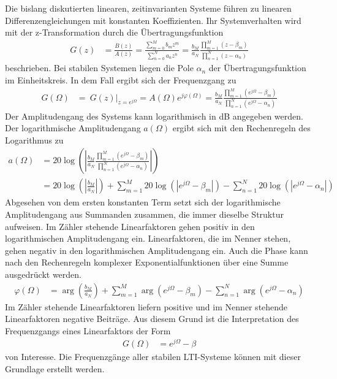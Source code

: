 Die bislang diskutierten linearen, zeitinvarianten Systeme führen zu linearen Differenzengleichungen mit konstanten Koeffizienten. Ihr Systemverhalten wird mit der z-Transformation durch die Übertragungsfunktion
\begin{align}
G(z) &= \frac{B(z)}{A(z)} = \frac{\sum\limits_{m = 0}^{M}{b_{m}  z^{m}}}{\sum\limits_{n = 0}^{N}{a_{n}  z^{n}}} = \frac{b_{M}}{a_{N}}  \frac{\prod\limits_{m = 1}^{M}\left( z - \beta_{m} \right)}{\prod\limits_{n = 1}^{N}\left( z - \alpha_{n} \right)} \label{eq:8.41}
\end{align}
beschrieben. Bei stabilen Systemen liegen die Pole \(α_{n}\) der Übertragungsfunktion im Einheitskreis. In dem Fall ergibt sich der Frequenzgang zu
\begin{align}
G(\Omega) &= \left. \ G(z) \right|_{z = e^{j  \Omega}} = A(\Omega)  e^{j  \varphi(\Omega)} = \frac{b_{M}}{a_{N}}  \frac{\prod\limits_{m = 1}^{M}\left( e^{j  \Omega} - \beta_{m} \right)}{\prod\limits_{n = 1}^{N}\left( e^{j  \Omega} - \alpha_{n} \right)} \label{eq:8.42}
\end{align}
Der Amplitudengang des Systems kann logarithmisch in dB angegeben werden. Der logarithmische Amplitudengang \(a(Ω)\) ergibt sich mit den Rechenregeln des Logarithmus zu
\begin{align}
{a\left(\Omega \right)} &=  {20 \log \left(\left|\frac{b_{M} }{a_{N} }  \frac{\prod\limits _{m=1}^{M}\left(e^{j \Omega } -\beta _{m} \right) }{\prod\limits _{n=1}^{N}\left(e^{j \Omega } -\alpha _{n} \right) } \right|\right)} \\
{} &=  {20 \log \left(\left|\frac{b_{M} }{a_{N} } \right|\right)+\sum\limits _{m=1}^{M}20 \log  \left(\left|e^{j \Omega } -\beta _{m} \right|\right)-\sum\limits _{n=1}^{N}20 \log  \left(\left|e^{j \Omega } -\alpha _{n} \right|\right)}
\label{eq:8.43}
\end{align}
Abgesehen von dem ersten konstanten Term setzt sich der logarithmische Amplitudengang aus Summanden zusammen, die immer dieselbe Struktur aufweisen. Im Zähler stehende Linearfaktoren gehen positiv in den logarithmischen Amplitudengang ein. Linearfaktoren, die im Nenner stehen, gehen negativ in den logarithmischen Amplitudengang ein. Auch die Phase kann nach den Rechenregeln komplexer Exponentialfunktionen über eine Summe ausgedrückt werden.
\begin{align}
\varphi(\Omega) &= \arg\left( \frac{b_{M}}{a_{N}} \right) + \sum\limits_{m = 1}^{M}{\arg\left( e^{j  \Omega} - \beta_{m} \right)} - \sum\limits_{n = 1}^{N}{\arg\left( e^{j  \Omega} - \alpha_{n} \right)} \label{eq:8.44}
\end{align}
Im Zähler stehende Linearfaktoren liefern positive und im Nenner stehende Linearfaktoren negative Beiträge. Aus diesem Grund ist die Interpretation des Frequenzgangs eines Linearfaktors der Form
\begin{align}
G(\Omega) &= e^{j  \Omega} - \beta \label{eq:8.45}
\end{align}
von Interesse. Die Frequenzgänge aller stabilen LTI-Systeme können mit dieser Grundlage erstellt werden.

